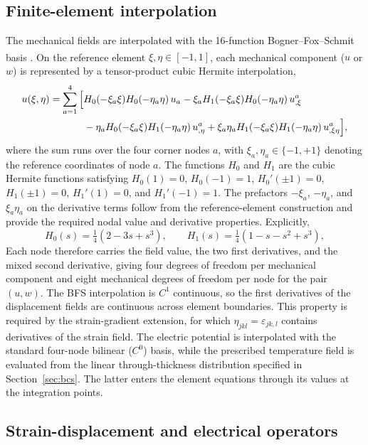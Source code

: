 \documentclass[a4paper, 11pt, twoside]{article}
\newcommand{\supercite}[1]{\!\!\textsuperscript{\cite{#1}}}
\begin{document}
\subsection{Finite-element interpolation}
\label{sec:discretization}

The mechanical fields are interpolated with the 16-function Bogner--Fox--Schmit
basis \supercite{Bogner1965}. On the reference element
$\xi,\eta\in[-1,1]$, each mechanical component ($u$ or $w$) is represented by a
tensor-product cubic Hermite interpolation,
\begin{align}
u(\xi,\eta)=\sum_{a=1}^{4}\Big[&
H_0(-\xi_a\xi)H_0(-\eta_a\eta)\,u_a
-\xi_aH_1(-\xi_a\xi)H_0(-\eta_a\eta)\,u_{,\xi}^a\notag\\
&-\eta_aH_0(-\xi_a\xi)H_1(-\eta_a\eta)\,u_{,\eta}^a
+\xi_a\eta_aH_1(-\xi_a\xi)H_1(-\eta_a\eta)\,u_{,\xi\eta}^a\Big],
\label{eq:bfs-interp}
\end{align}
where the sum runs over the four corner nodes $a$, with
$\xi_a,\eta_a\in\{-1,+1\}$ denoting the reference coordinates of node $a$.
The functions $H_0$ and $H_1$ are the cubic Hermite functions satisfying
$H_0(1)=0$, $H_0(-1)=1$, $H_0'(\pm1)=0$,
$H_1(\pm1)=0$, $H_1'(1)=0$, and $H_1'(-1)=1$. The prefactors
$-\xi_a$, $-\eta_a$, and $\xi_a\eta_a$ on the derivative terms follow from the
reference-element construction and provide the required nodal value and derivative
properties. Explicitly,
\begin{equation}
H_0(s)=\tfrac14(2-3s+s^3),\qquad
H_1(s)=\tfrac14(1-s-s^2+s^3),
\label{eq:hermite}
\end{equation}
Each node therefore carries the field value, the two first derivatives, and the mixed
second derivative, giving four degrees of freedom per mechanical component and eight
mechanical degrees of freedom per node for the pair $(u,w)$. The BFS interpolation is
$C^1$ continuous, so the first derivatives of the displacement fields are continuous
across element boundaries. This property is required by the strain-gradient extension,
for which $\eta_{jkl}=\varepsilon_{jk,l}$ contains derivatives of the strain field.
The electric potential is interpolated with the standard four-node bilinear ($C^0$)
basis, while the prescribed temperature field is evaluated from the linear
through-thickness distribution specified in Section~\ref{sec:bcs}. The latter enters
the element equations through its values at the integration points.

\subsection{Strain-displacement and electrical operators}
\label{sec:Bops}
\end{document}
